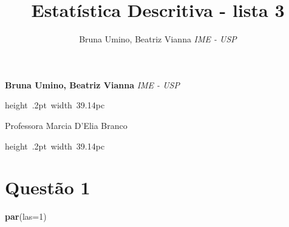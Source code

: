 \documentclass[11pt,]{article}
\title{Estatística Descritiva - lista 3  }
\author{\Large Bruna Umino, Beatriz Vianna\vspace{0.05in} \newline\normalsize\emph{IME - USP}  }
\date{}
\newcommand*{\authorfont}{\fontfamily{phv}\selectfont}
\renewenvironment{abstract}
 {{%
    \setlength{\leftmargin}{0mm}
    \setlength{\rightmargin}{\leftmargin}%
  }%
  \relax}
 {\endlist}
\newenvironment{Shaded}{\begin{snugshade}}{\end{snugshade}}
\newcommand{\KeywordTok}[1]{\textcolor[rgb]{0.13,0.29,0.53}{\textbf{{#1}}}}
\newcommand{\DataTypeTok}[1]{\textcolor[rgb]{0.13,0.29,0.53}{{#1}}}
\newcommand{\DecValTok}[1]{\textcolor[rgb]{0.00,0.00,0.81}{{#1}}}
\newcommand{\NormalTok}[1]{{#1}}
\begin{document}
	
%

{%
\setlength{\parindent}{0pt}
\thispagestyle{plain}
{\fontsize{18}{20}\selectfont\raggedright 
\maketitle  %

}

{
   \vskip 13.5pt\relax \normalsize\fontsize{11}{12} 
\textbf{\authorfont Bruna Umino, Beatriz Vianna} \hskip 15pt \emph{\small IME - USP}   

}

}







\begin{abstract}

    \hbox{\vrule height .2pt width 39.14pc}

    \vskip 8.5pt %

\noindent Professora Marcia D'Elia Branco


    \hbox{\vrule height .2pt width 39.14pc}


\end{abstract}


\vskip 6.5pt

\noindent  \section{Questão 1}\label{questao-1}

\begin{Shaded}
\begin{Highlighting}[]
\KeywordTok{par}\NormalTok{(}\DataTypeTok{las=}\DecValTok{1}\NormalTok{)}
\end{Highlighting}
\end{Shaded}
\end{document}
